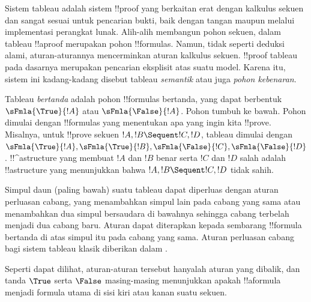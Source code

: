\documentclass[../../../include/open-logic-section]{subfiles}
\begin{document}


Sistem tableau adalah sistem !!{proof} yang berkaitan erat dengan
kalkulus sekuen dan sangat sesuai untuk pencarian bukti, baik dengan
tangan maupun melalui implementasi perangkat lunak. Alih-alih membangun
pohon sekuen, dalam tableau !!a{proof} merupakan pohon !!{formula}s.
Namun, tidak seperti deduksi alami, aturan-aturannya mencerminkan aturan
kalkulus sekuen. !!{proof} tableau pada dasarnya merupakan pencarian
eksplisit atas suatu model. Karena itu, sistem ini kadang-kadang disebut
tableau \emph{semantik} atau juga \emph{pohon kebenaran}.

Tableau \emph{bertanda} adalah pohon !!{formula}s bertanda, yang dapat
berbentuk $\sFmla{\True}{!A}$ atau $\sFmla{\False}{!A}$. Pohon tumbuh ke
bawah. Pohon dimulai dengan !!{formula}s yang menentukan apa yang ingin
kita !!{prove}. Misalnya, untuk !!{prove} sekuen $!A, !B \Sequent !C,
!D$, tableau dimulai dengan $\sFmla{\True}{!A}, \sFmla{\True}{!B},
\sFmla{\False}{!C}, \sFmla{\False}{!D}$. !!^a{structure} yang membuat
$!A$ dan $!B$ benar serta $!C$ dan $!D$ salah adalah !!a{structure} yang
menunjukkan bahwa $!A, !B \Sequent !C, !D$ tidak sahih.

Simpul daun (paling bawah) suatu tableau dapat diperluas dengan aturan
perluasan cabang, yang menambahkan simpul lain pada cabang yang sama atau
menambahkan dua simpul bersaudara di bawahnya sehingga cabang terbelah
menjadi dua cabang baru. Aturan dapat diterapkan kepada sembarang
!!{formula} bertanda di atas simpul itu pada cabang yang sama. Aturan
perluasan cabang bagi sistem tableau klasik  diberikan dalam
.



Seperti dapat dilihat, aturan-aturan tersebut hanyalah aturan 
yang dibalik, dan tanda $\True$ serta $\False$ masing-masing menunjukkan
apakah !!a{formula} menjadi formula utama di sisi kiri atau kanan suatu
sekuen.
\end{document}

